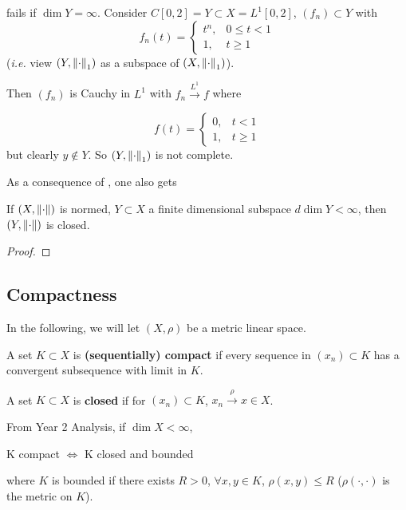 \documentclass{article}
\begin{document}
\begin{example}
     fails if $\dim Y =\infty$. Consider $C[0,2]=Y \subset X = L^1[0,2]$, $(f_n) \subset Y$ with  
    $$
    f_n(t) = \begin{cases}
        t^n, & 0\leq t <1 \\
        1, & t\geq 1
    \end{cases}
    $$  
    (\textit{i.e.} view $(Y, \left\|{\cdot}\right\|_1)$ as a subspace of $(X, \left\|{\cdot}\right\|_1)$). 
    
    Then $(f_n)$ is Cauchy in $L^1$ with $f_n \overset{L^1}{\longrightarrow} f$ where  

    $$
    f(t) = \begin{cases}
        0, & t<1 \\
        1, & t \geq 1
    \end{cases}
    $$  
    but clearly $y \notin Y$. So $(Y, \left\|{\cdot}\right\|_1)$ is not complete. 
\end{example}

As a consequence of , one also gets  

\begin{corollary}
    If $(X, \left\|{\cdot}\right\|)$ is normed, $Y \subset X$ a finite dimensional subspace $d\dim Y < \infty$, then $(Y, \left\|{\cdot}\right\|)$ is closed.
\end{corollary}
\begin{proof}
    
\end{proof}

\subsection{Compactness}  

In the following, we will let $(X, \rho)$ be a metric linear space.  

\begin{definition}[Compact] \nextline
    A set $K \subset X$ is \textbf{(sequentially) compact} 
    if every sequence in $(x_n) \subset K$ has a convergent subsequence with limit in $K$.
\end{definition}    

\begin{definition}[Closed]\nextline
    A set $K \subset X$ is \textbf{closed} if for $(x_n) \subset K$, $x_n \overset{\rho}{\longrightarrow} x \in X$.
\end{definition}


\begin{remark}
    From Year 2 Analysis, if $\dim X < \infty$,  
    \begin{center}
        K compact $\iff$ K closed and bounded
    \end{center}
    where $K$ is bounded if there exists $R>0$, $\forall x,y \in K$, $\rho(x,y) \leq R$ ($\rho(\cdot, \cdot)$ is the metric on $K$). 
\end{remark}  
\end{document}
